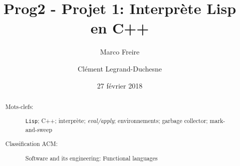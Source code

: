 \documentclass[a4paper,11pt]{article}%
\begin{document}
\title{Prog2 - Projet 1: Interprète Lisp en C++}

\author{Marco Freire \and Clément Legrand-Duchesne}

\date{27 février 2018}

\maketitle

\begin{abstract}
  
  \begin{description}
    
  \item[Mots-clefs:] \texttt{Lisp}; C++; interprète; \emph{eval/apply}; environnements; garbage collector; mark-and-sweep
      
  \item[Classification ACM:] Software and its engineering: Functional languages

  \end{description}
\end{abstract}

\renewcommand{\contentsname}{Plan}
\tableofcontents
\end{document}
